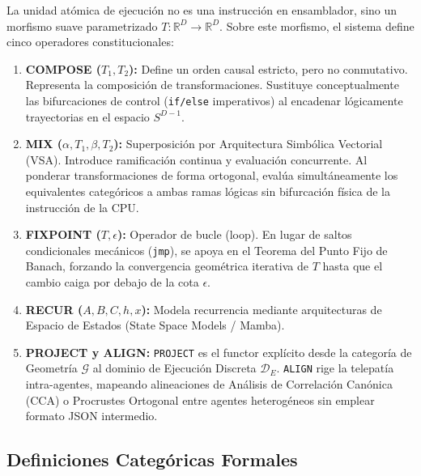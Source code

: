 La unidad atómica de ejecución no es una instrucción en ensamblador, sino un morfismo suave parametrizado $T : \mathbb{R}^D \rightarrow \mathbb{R}^D$. Sobre este morfismo, el sistema define cinco operadores constitucionales:
\begin{enumerate}
    \item \textbf{COMPOSE ($T_1, T_2$):} Define un orden causal estricto, pero no conmutativo. Representa la composición de transformaciones. Sustituye conceptualmente las bifurcaciones de control (\texttt{if/else} imperativos) al encadenar lógicamente trayectorias en el espacio $S^{D-1}$.
    \item \textbf{MIX ($\alpha, T_1, \beta, T_2$):} Superposición por Arquitectura Simbólica Vectorial (VSA). Introduce ramificación continua y evaluación concurrente. Al ponderar transformaciones de forma ortogonal, evalúa simultáneamente los equivalentes categóricos a ambas ramas lógicas sin bifurcación física de la instrucción de la CPU.
    \item \textbf{FIXPOINT ($T, \epsilon$):} Operador de bucle (loop). En lugar de saltos condicionales mecánicos (\texttt{jmp}), se apoya en el Teorema del Punto Fijo de Banach, forzando la convergencia geométrica iterativa de $T$ hasta que el cambio caiga por debajo de la cota $\epsilon$.
    \item \textbf{RECUR ($A, B, C, h, x$):} Modela recurrencia mediante arquitecturas de Espacio de Estados (State Space Models / Mamba).
    \item \textbf{PROJECT y ALIGN:} \texttt{PROJECT} es el functor explícito desde la categoría de Geometría $\mathcal{G}$ al dominio de Ejecución Discreta $\mathcal{D}_E$. \texttt{ALIGN} rige la telepatía intra-agentes, mapeando alineaciones de Análisis de Correlación Canónica (CCA) o Procrustes Ortogonal entre agentes heterogéneos sin emplear formato JSON intermedio.
\end{enumerate}

\subsection{Definiciones Categóricas Formales}

